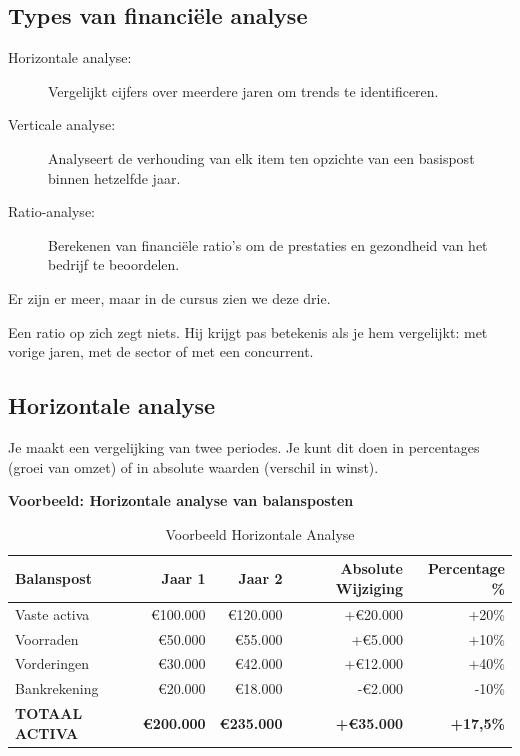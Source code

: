 \documentclass[a4paper,11pt]{article}
\begin{document}
\subsection{Types van financiële analyse}
\begin{description}
    \item [Horizontale analyse:] Vergelijkt cijfers over meerdere jaren om trends te identificeren.
    \item [Verticale analyse:] Analyseert de verhouding van elk item ten opzichte van een basispost binnen hetzelfde jaar.
    \item [Ratio-analyse:] Berekenen van financiële ratio's om de prestaties en gezondheid van het bedrijf te beoordelen.
\end{description}
Er zijn er meer, maar in de cursus zien we deze drie.
\newline

Een ratio op zich zegt niets. Hij krijgt pas betekenis als je hem vergelijkt:
met vorige jaren, met de sector of met een concurrent.

\subsection{Horizontale analyse}
Je maakt een vergelijking van twee periodes.
Je kunt dit doen in percentages (groei van omzet)
of in absolute waarden (verschil in winst).

\textbf{Voorbeeld: Horizontale analyse van balansposten}

\begin{table}[ht]
    \centering
    \begin{tabular}{|l|r|r|r|r|}
        \hline
        \textbf{Balanspost}    & \textbf{Jaar 1}   & \textbf{Jaar 2}   & \textbf{Absolute Wijziging} & \textbf{Percentage \%} \\
        \hline
        Vaste activa           & €100.000          & €120.000          & +€20.000                    & +20\%                  \\
        Voorraden              & €50.000           & €55.000           & +€5.000                     & +10\%                  \\
        Vorderingen            & €30.000           & €42.000           & +€12.000                    & +40\%                  \\
        Bankrekening           & €20.000           & €18.000           & -€2.000                     & -10\%                  \\
        \hline
        \textbf{TOTAAL ACTIVA} & \textbf{€200.000} & \textbf{€235.000} & \textbf{+€35.000}           & \textbf{+17,5\%}       \\
        \hline
    \end{tabular}
    \caption{Voorbeeld Horizontale Analyse}
\end{table}
\end{document}
